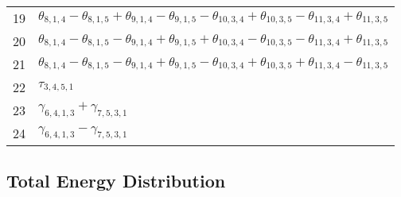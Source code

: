 \documentclass[10pt,oneside]{article}
\begin{document}
\begin{table}[h!]
\begin{tabular}{ll}
  19  & $\theta_{8,1,4} - \theta_{8,1,5} + \theta_{9,1,4} - \theta_{9,1,5} - \theta_{10,3,4} + \theta_{10,3,5} - \theta_{11,3,4} + \theta_{11,3,5}$ \\
  20  & $\theta_{8,1,4} - \theta_{8,1,5} - \theta_{9,1,4} + \theta_{9,1,5} + \theta_{10,3,4} - \theta_{10,3,5} - \theta_{11,3,4} + \theta_{11,3,5}$ \\
  21  & $\theta_{8,1,4} - \theta_{8,1,5} - \theta_{9,1,4} + \theta_{9,1,5} - \theta_{10,3,4} + \theta_{10,3,5} + \theta_{11,3,4} - \theta_{11,3,5}$ \\
  22  & $\tau_{3,4,5,1}$ \\
  23  & $\gamma_{6,4,1,3} + \gamma_{7,5,3,1}$ \\
  24  & $\gamma_{6,4,1,3} - \gamma_{7,5,3,1}$ \\
\bottomrule
\end{tabular}
\end{table}

\begin{table}
\subsection*{Total Energy Distribution}
\centering\end{table}

\clearpage

\subsection{}
\end{document}
